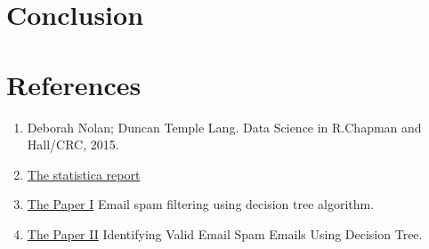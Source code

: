 \documentclass[
]{article}
\providecommand{\tightlist}{%
  \setlength{\itemsep}{0pt}\setlength{\parskip}{0pt}}
\begin{document}
\newpage

\hypertarget{conclusion}{%
\section{Conclusion}\label{conclusion}}

\newpage

\hypertarget{references}{%
\section*{References}\label{references}}

\begin{enumerate}
\def\labelenumi{\arabic{enumi}.}
\tightlist
\item
  Deborah Nolan; Duncan Temple Lang. Data Science in R.Chapman and
  Hall/CRC, 2015.
\item
  \href{https://www.statista.com/statistics/420391/spam-email-traffic-share/}{The
  statistica report}
\item
  \href{https://www.ijser.org/researchpaper/EMAIL-SPAM-FILTERING-USING-DECISION-TREE-ALGORITHM.pdf}{The
  Paper I} Email spam filtering using decision tree algorithm.
\item
  \href{https://ijcat.com/archives/volume5/issue2/ijcatr05021004.pdf}{The
  Paper II} Identifying Valid Email Spam Emails Using Decision Tree.
\end{enumerate}
\end{document}
